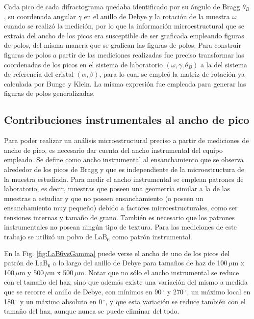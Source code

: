 Cada pico de cada difractograma quedaba identificado por su ángulo de Bragg $\theta_B$, su coordenada angular $\gamma$ en el anillo de Debye y la rotación de la muestra $\omega$ cuando se realizó la medición, por lo que la información microestructural que se extraía del ancho de los picos era susceptible de ser graficada empleando figuras de polos, del misma manera que se grafican las figuras de polos.
Para construir figuras de polos a partir de las mediciones realizadas fue preciso transformar las coordenadas de los picos en el sistema de laboratorio $(\omega, \gamma, \theta_B)$ a la del sistema de referencia del cristal $(\alpha, \beta)$, para lo cual se empleó la matriz de rotación ya calculada por Bunge y Klein\cite{Bunge1996}.
La misma expresión fue empleada para generar las figuras de polos generalizadas.

\subsection{Contribuciones instrumentales al ancho de pico}\label{SS:inst}
Para poder realizar un análisis microestructural preciso a partir de mediciones de ancho de pico, es necesario dar cuenta del ancho instrumental del equipo empleado.
Se define como ancho instrumental al ensanchamiento que se observa alrededor de los picos de Bragg y que es independiente de la microestructura de la muestra estudiada.
Para medir el ancho instrumental se emplean patrones de laboratorio, es decir, muestras que poseen una geometría similar a la de las muestras a estudiar y que no poseen ensanchamiento (o poseen un ensanchamiento muy pequeño) debido a factores microestructurales, como ser tensiones internas y tamaño de grano.
También es necesario que los patrones instrumentales no posean ningún tipo de textura.
Para las mediciones de este trabajo se utilizó un polvo de LaB$_6$ como patrón instrumental.

En la Fig. \ref{fig:LaB6vsGamma} puede verse el ancho de uno de los picos del patrón de LaB$_6$ a lo largo del anillo de Debye para tamaños de haz de 100\,$\mu$m x 100\,$\mu$m y 500\,$\mu$m x 500\,$\mu$m.
Notar que no sólo el ancho instrumental se reduce con el tamaño del haz, sino que además existe una variación del mismo a medida que se recorre el anillo de Debye, con mínimos en 90\,$^{\circ}$ y 270\,$^{\circ}$, un máximo local en 180\,$^{\circ}$ y un máximo absoluto en 0\,$^{\circ}$, y que esta variación se reduce también con el tamaño del haz, aunque nunca se puede eliminar del todo.

